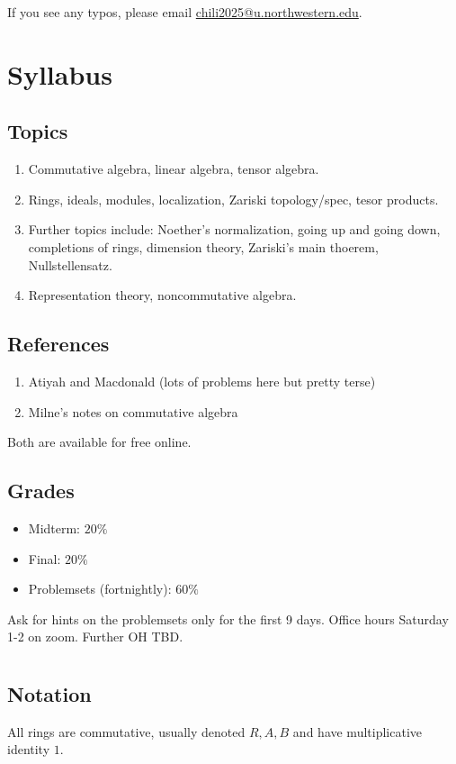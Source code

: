If you see any typos, please email \href{mailto:chili2025@u.northwestern.edu}{chili2025@u.northwestern.edu}.
\section{Syllabus}
\newsection

\subsection*{Topics}
\begin{enumerate}
    \item Commutative algebra, linear algebra, tensor algebra.
    \item Rings, ideals, modules, localization, Zariski topology/spec, tesor products.
    \item Further topics include: Noether's normalization, going up and going down, completions of rings, dimension theory, Zariski's main thoerem, Nullstellensatz.
    \item Representation theory, noncommutative algebra.
\end{enumerate}
\subsection*{References}
\begin{enumerate}
    \item Atiyah and Macdonald (lots of problems here but pretty terse)
    \item Milne's notes on commutative algebra
\end{enumerate}
Both are available for free online.
\subsection*{Grades}
\begin{itemize}
    \item Midterm: $20\%$
    \item Final: $20\%$
    \item Problemsets (fortnightly): $60\%$
\end{itemize}
Ask for hints on the problemsets only for the first 9 days. Office hours Saturday 1-2 on zoom. Further OH TBD.
\section{}
\subsection*{Notation}
All rings are commutative, usually denoted $R, A, B$ and have multiplicative identity $1$.


